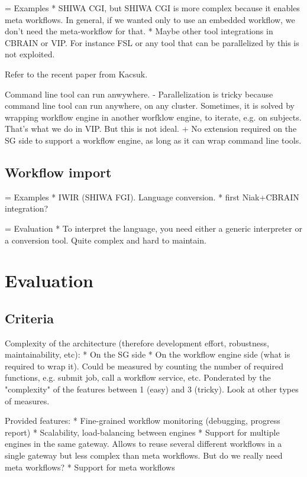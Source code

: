 \documentclass[preprint,3p,twocolumn]{elsarticle}
\begin{document}
=  Examples
* SHIWA CGI, but SHIWA CGI is more complex because it enables meta workflows. In general, if we wanted only to use an embedded workflow, we don't need the meta-workflow for that. 
* Maybe other tool integrations in CBRAIN or VIP. For instance FSL or any tool that can be parallelized by this is not exploited.

Refer to the recent paper from Kacsuk. 

Command line tool can run anwywhere.
- Parallelization is tricky because command line tool can run anywhere, on any cluster. Sometimes, it is solved by wrapping workflow engine in another worfklow engine, to iterate, e.g. on subjects. That's what we do in VIP. But this is not ideal.
+ No extension required on the SG side to support a workflow engine, as long as it can wrap command line tools.

\subsection{Workflow import}

= Examples
* IWIR (SHIWA FGI). Language conversion.
* first Niak+CBRAIN integration?

= Evaluation
* To interpret the language, you need either a generic interpreter or a conversion tool. Quite complex and hard to  maintain.

\section{Evaluation}

\subsection{Criteria}

Complexity of the architecture (therefore development effort, robustness, maintainability, etc):
  * On the SG side
  * On the workflow engine side (what is required to wrap it).
Could be measured by counting the number of required functions,
e.g. submit job, call a workflow service, etc. Ponderated by the
"complexity" of the features between 1 (easy) and 3 (tricky). Look at
other types of measures.

Provided features:
  * Fine-grained workflow monitoring (debugging, progress report)
  * Scalability, load-balancing between engines
  * Support for multiple engines in the same gateway. Allows to reuse several different workflows in a single gateway but less complex than meta workflows. But do we really need meta workflows?
  * Support for meta workflows
\end{document}
